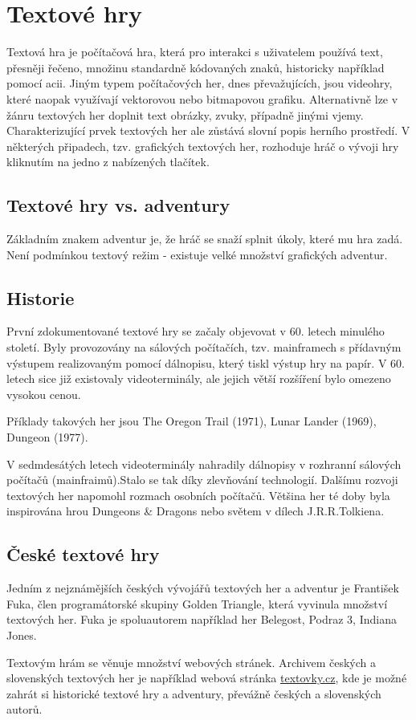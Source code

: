 \documentclass[main.tex]{subfiles}
\begin{document}
\section{Textové hry}
Textová hra je počítačová hra, která pro interakci s uživatelem používá text, přesněji řečeno, množinu standardně kódovaných znaků, historicky například pomocí acii. Jiným typem počítačových her, dnes převažujících, jsou videohry, které naopak využívají vektorovou nebo bitmapovou grafiku. \cite{web:wik:en:textgame} Alternativně lze v žánru textových her doplnit text obrázky, zvuky, případně jinými vjemy. Charakterizující prvek textových her ale zůstává slovní popis herního prostředí. V některých připadech, tzv. grafických textových her, rozhoduje hráč o vývoji hry kliknutím na jedno z nabízených tlačítek.\cite{web:wik:cz:textovahra}

\subsection{Textové hry vs. adventury}
Základním znakem adventur je, že hráč se snaží splnit úkoly, které mu hra zadá. Není podmínkou textový režim - existuje velké množství grafických adventur. \cite{web:wik:cz:adventura}

\subsection{Historie}
První zdokumentované textové hry se začaly objevovat v 60. letech minulého století. Byly provozovány na sálových počítačích, tzv. mainframech s přídavným výstupem realizovaným pomocí dálnopisu, který tiskl výstup hry na papír. V 60. letech sice již existovaly videoterminály, ale jejich větší rozšíření bylo omezeno vysokou cenou. \cite{web:pcmag:en:oldcomputergames, web:wik:en:textgame}


Příklady takových her jsou The Oregon Trail (1971), Lunar Lander (1969), Dungeon (1977). \cite{web:pcmag:en:oldcomputergames}

V sedmdesátých letech videoterminály nahradily dálnopisy v rozhranní sálových počítačů (mainfraimů).Stalo se tak díky zlevňování technologií. Dalšímu rozvoji textových her napomohl rozmach osobních počítačů. Většina her té doby byla inspirována hrou Dungeons \& Dragons nebo světem v dílech J.R.R.Tolkiena. \cite{web:pcgamer:en:historyrpgs}  


\subsection{České textové hry}
Jedním z nejznámějších českých vývojářů textových her a adventur je František Fuka, člen programátorské skupiny Golden Triangle, která vyvinula množství textových her. Fuka je spoluautorem například her Belegost, Podraz 3, Indiana Jones.

Textovým hrám se věnuje množství webových stránek. Archivem českých a slovenských textových her je například webová stránka \href{https://www.textovky.cz}{textovky.cz}, kde je možné zahrát si historické textové hry a adventury, převážně českých a slovenských autorů. \cite{web:text:cz:archiv}
\end{document}
